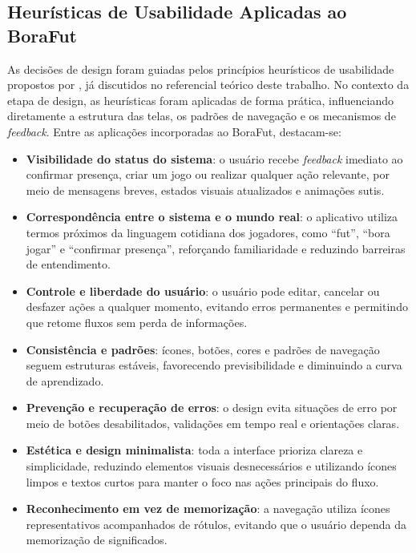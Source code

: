     \subsection{Heurísticas de Usabilidade Aplicadas ao BoraFut}
      As decisões de design foram guiadas pelos princípios heurísticos de usabilidade propostos por , já discutidos no referencial teórico deste trabalho. No contexto da etapa de design, as heurísticas foram aplicadas de forma prática, influenciando diretamente a estrutura das telas, os padrões de navegação e os mecanismos de \textit{feedback}. Entre as aplicações incorporadas ao BoraFut, destacam-se:

      \begin{itemize}
        \item \textbf{Visibilidade do status do sistema}: o usuário recebe \textit{feedback} imediato ao confirmar presença, criar um jogo ou realizar qualquer ação relevante, por meio de mensagens breves, estados visuais atualizados e animações sutis.
    
        \item \textbf{Correspondência entre o sistema e o mundo real}: o aplicativo utiliza termos próximos da linguagem cotidiana dos jogadores, como “fut”, “bora jogar” e “confirmar presença”, reforçando familiaridade e reduzindo barreiras de entendimento.
    
        \item \textbf{Controle e liberdade do usuário}: o usuário pode editar, cancelar ou desfazer ações a qualquer momento, evitando erros permanentes e permitindo que retome fluxos sem perda de informações.
    
        \item \textbf{Consistência e padrões}: ícones, botões, cores e padrões de navegação seguem estruturas estáveis, favorecendo previsibilidade e diminuindo a curva de aprendizado.
    
        \item \textbf{Prevenção e recuperação de erros}: o design evita situações de erro por meio de botões desabilitados, validações em tempo real e orientações claras.
    
        \item \textbf{Estética e design minimalista}: toda a interface prioriza clareza e simplicidade, reduzindo elementos visuais desnecessários e utilizando ícones limpos e textos curtos para manter o foco nas ações principais do fluxo.
    
        \item \textbf{Reconhecimento em vez de memorização}: a navegação utiliza ícones representativos acompanhados de rótulos, evitando que o usuário dependa da memorização de significados.
    

\end{itemize}
